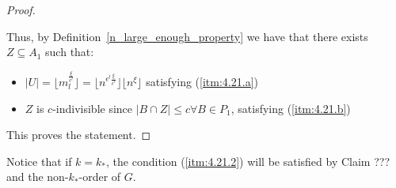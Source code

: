 \begin{proof}
\begin{itemize}
            \end{itemize}
            Thus, by Definition~\ref{n_large_enough_property} we have that there exists $Z \subseteq A_1$ such that:
            \begin{itemize}
                \item $|U| = \lfloor m_l^{\frac{\xi}{\epsilon^l}} \rfloor = \lfloor n^{\epsilon^l \frac{\xi}{\epsilon^l}} \rfloor
                    \lfloor n^\xi \rfloor$ satisfying (\ref{itm:4.21.a})
                \item $Z$ is $c$-indivisible since $|B \cap Z| \leq c \forall B \in P_1$, satisfying (\ref{itm:4.21.b})
            \end{itemize}
            This proves the statement.
        \end{proof}

    \lemma[Remark 4.22]\label{k_asterisk_enough_for_k}
    Notice that if $k = k_*$, the condition (\ref{itm:4.21.2}) will be satisfied by Claim ??? %
        and the non-$k_*$-order of $G$.

